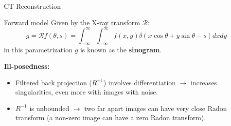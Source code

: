 \begin{frame}{CT Reconstruction}

\begin{block}{Forward model}
Given by the X-ray transform $\mathcal{R}$:
$$
g = \mathcal{R}f(\theta,s)= \int_{-\infty}^{\infty}\int_{-\infty}^{\infty}f(x,y)\delta(x\cos\theta+y\sin\theta-s)dxdy
$$
in this parametrization $g$ is known as the \textbf{sinogram}.
\end{block}

\pause
\bigskip

\textbf{Ill-posedness:}    
\begin{itemize}
\item Filtered back projection ($R^{-1}$) involves differentiation $\longrightarrow$ increases singularities, even more with images with noise. 
\item $R^{-1}$ is unbounded $\longrightarrow$ two far apart images can have very close Radon transform (a non-zero image can have a zero Radon transform).
\end{itemize}
\end{frame}


